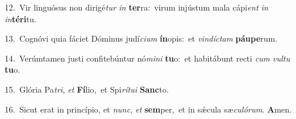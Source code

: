 {\numbfont\textcolor{\numbcolor}{12.}}~Vir linguósus non dirigé\textit{tur} \textit{in} \textbf{ter}\-ra:~\star virum injústum mala cápi\textit{ent} \textit{in} \textit{in}\-\textbf{tér}\textbf{i}tu.\par
{\numbfont\textcolor{\numbcolor}{13.}}~Cognóvi quia fáciet Dóminus judí\-\textit{ci}\-\textit{um} \textbf{ín}\-opis:~\star et \textit{vin}\-\textit{díc}\textit{tam} \textbf{páu}\-\textbf{pe}rum.\par
{\numbfont\textcolor{\numbcolor}{14.}}~Verúmtamen justi confitebúntur nó\-\textit{mi}\-\textit{ni} \textbf{tu}\-o:~\star et habitábunt recti \textit{cum} \textit{vul}\-\textit{tu} \textbf{tu}\-o.\par
{\numbfont\textcolor{\numbcolor}{15.}}~Glória Pa\-\textit{tri}\-, \textit{et} \textbf{Fí}\-lio,~\star et Spi\-\textit{rí}\-\textit{tu}\textit{i} \textbf{Sanc}\-to.\par
{\numbfont\textcolor{\numbcolor}{16.}}~Sicut erat in princípio, et \textit{nunc}\-, \textit{et} \textbf{sem}\-per,~\star et in sǽcula sæ\-\textit{cu}\-\textit{ló}\textit{rum}. \textbf{A}\-men.\par
